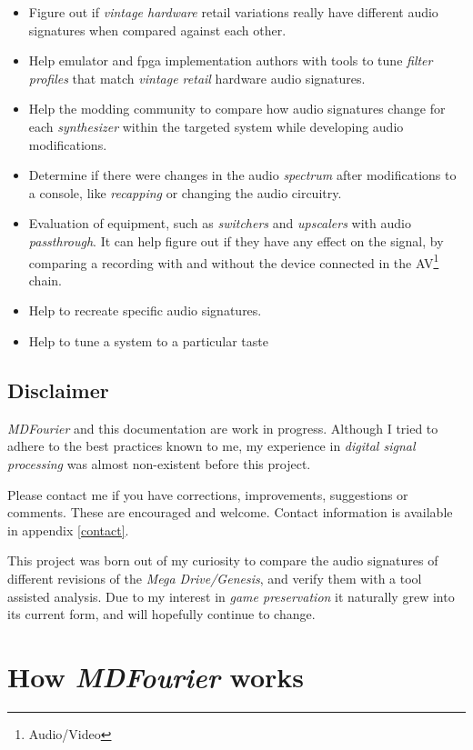 \documentclass[10pt,a4paper]{report}
\begin{document}
\begin{itemize}
	\item Figure out if \textit{vintage hardware} retail variations really have different audio signatures when compared against each other.
	\item Help emulator and \acrshort{fpga} implementation authors with tools to tune \textit{filter profiles} that match \textit{vintage retail} hardware audio signatures.
	\item Help the modding community to compare how audio signatures change for each \textit{synthesizer} within the targeted system while developing audio modifications.
	\item Determine if there were changes in the audio \textit{spectrum} after modifications to a console, like \textit{recapping} or changing the audio circuitry.
	\item Evaluation of equipment, such as \textit{switchers} and \textit{upscalers} with audio \textit{passthrough}. It can help figure out if they have any effect on the signal, by comparing a recording with and without the device connected in the AV\footnote{Audio/Video} chain.
	\item Help to recreate specific audio signatures.
	\item Help to tune a system to a particular taste
\end{itemize}

\newpage
\section{Disclaimer}

\textit{MDFourier} and this documentation are work in progress. Although I tried to adhere to the best practices known to me, my experience in \textit{digital signal processing} was almost non-existent before this project. 

Please contact me if you have corrections, improvements, suggestions or comments. These are encouraged and welcome. Contact information is available in appendix \ref{contact}.

This project was born out of my curiosity to compare the audio signatures of different revisions of the \textit{Mega Drive/Genesis}, and verify them with a tool assisted analysis. Due to my interest in \textit{game preservation} it naturally grew into its current form, and will hopefully continue to change.

\chapter{How \textit{MDFourier} works}
\label{howitworks}
\end{document}
